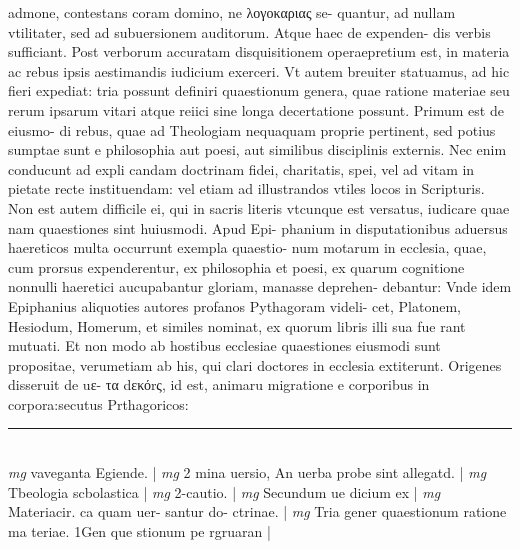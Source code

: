 \documentclass{article}
\begin{document}
\begin{pages}
admone, contestans coram domino, ne λογοκαριας se- quantur, ad nullam vtilitater, sed ad subuersionem auditorum. Atque  haec de expenden- dis verbis sufficiant. Post verborum accuratam disquisitionem operaepretium est, in materia ac rebus ipsis aestimandis iudicium exerceri. Vt autem breuiter statuamus, ad hic fieri expediat: tria possunt definiri quaestionum genera, quae ratione materiae seu rerum ipsarum vitari atque  reiici sine longa decertatione possunt. Primum est de eiusmo- di rebus, quae ad Theologiam nequaquam proprie pertinent, sed potius sumptae sunt e philosophia aut poesi, aut similibus disciplinis externis. Nec enim conducunt ad expli candam doctrinam fidei, charitatis, spei, vel ad vitam in pietate recte instituendam: vel etiam ad illustrandos vtiles locos in Scripturis. Non est autem difficile ei, qui in sacris literis vtcunque  est versatus, iudicare quae nam quaestiones sint huiusmodi. Apud Epi- phanium in disputationibus aduersus haereticos multa occurrunt exempla quaestio- num motarum in ecclesia, quae, cum prorsus expenderentur, ex philosophia et poesi, ex quarum cognitione nonnulli haeretici aucupabantur gloriam, manasse deprehen- debantur: Vnde idem Epiphanius aliquoties autores profanos Pythagoram videli- cet, Platonem, Hesiodum, Homerum, et similes nominat, ex quorum libris illi sua fue rant mutuati. Et non modo ab hostibus ecclesiae quaestiones eiusmodi sunt propositae, verumetiam ab his, qui clari doctores in ecclesia extiterunt. Origenes disseruit de uε- τα dεκόrς, id est, animaru migratione e corporibus in corpora:secutus Prthagoricos:  \pend
\vspace{0.5cm}\noindent
\vspace{0.2cm}\rule{1cm}{0.2pt}\\ 
\hspace{0.2cm}\textit{mg}
\footnotesize vaveganta Egiende. 
\normalsize| 
\hspace{0.2cm}\textit{mg}
\footnotesize 2 mina uersio, An uerba probe sint allegatd. 
\normalsize| 
\hspace{0.2cm}\textit{mg}
\footnotesize Tbeologia scbolastica 
\normalsize| 
\hspace{0.2cm}\textit{mg}
\footnotesize 2-cautio. 
\normalsize| 
\hspace{0.2cm}\textit{mg}
\footnotesize Secundum ue dicium ex 
\normalsize| 
\hspace{0.2cm}\textit{mg}
\footnotesize Materiacir. ca quam uer- santur do- ctrinae. 
\normalsize| 
\hspace{0.2cm}\textit{mg}
\footnotesize Tria gener quaestionum ratione ma teriae. 1Gen que stionum pe rgruaran 
\normalsize| 

\end{pages}
\end{document}
